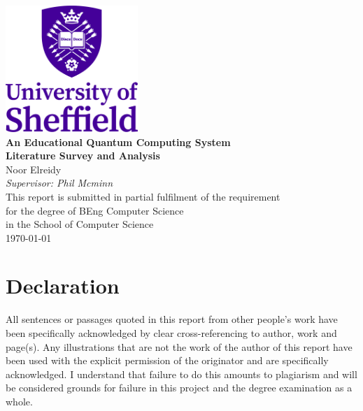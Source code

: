 \documentclass[12pt,oneside]{book}
\begin{document}
\frontmatter

\begin{titlepage}


\begin{center}
\includegraphics[width=5cm]{images/UOSLogo_Portrait_Violet_RGB.png}\\[2cm]
\linespread{1.2}\huge {\bfseries An Educational Quantum Computing System}\\[1cm]
\linespread{1}\LARGE {\bfseries Literature Survey and Analysis}\\[1.5cm]
\linespread{1}
{\Large Noor Elreidy}\\[0.5cm]
{\large \emph{Supervisor: Phil Mcminn}}\\[1cm]
\large{This report is submitted in partial fulfilment of the requirement\\[0.3cm]for the degree of} BEng Computer Science\\[0.3cm] 
{in the}
School of Computer Science\\[1cm]
\today
\end{center}

\end{titlepage}


\newpage
\chapter*{\Large Declaration}


All sentences or passages quoted in this report from other people's work have been specifically acknowledged by clear cross-referencing to author, work and page(s). Any illustrations that are not the work of the author of this report have been used with the explicit permission of the originator and are specifically acknowledged. I understand that failure to do this amounts to plagiarism and will be considered grounds for failure in this project and the degree examination as a whole.\\[1cm]
\end{document}
